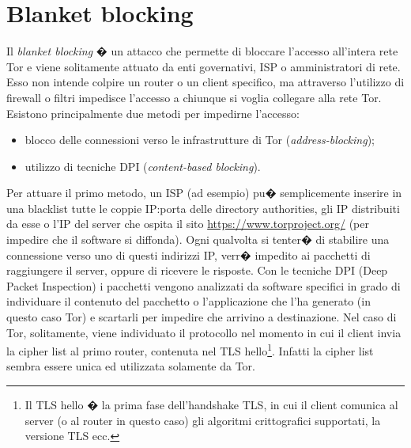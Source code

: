 \chapter{Blanket blocking}
Il \emph{blanket blocking} � un attacco che permette di bloccare l'accesso all'intera rete Tor e viene solitamente attuato da enti governativi, ISP o amministratori di rete. Esso non intende colpire un router o un client specifico, ma attraverso l'utilizzo di firewall o filtri impedisce l'accesso a chiunque si voglia collegare alla rete Tor.
Esistono principalmente due metodi per impedirne l'accesso:
\begin{itemize}
\item blocco delle connessioni verso le infrastrutture di Tor (\emph{address-blocking});
\item utilizzo di tecniche DPI (\emph{content-based blocking}).
\end{itemize}
Per attuare il primo metodo, un ISP (ad esempio) pu� semplicemente inserire in una blacklist tutte le coppie IP:porta delle directory authorities, gli IP distribuiti da esse o l'IP del server che ospita il sito \url{https://www.torproject.org/} (per impedire che il software si diffonda). Ogni qualvolta si tenter� di stabilire una connessione verso uno di questi indirizzi IP, verr� impedito ai pacchetti di raggiungere il server, oppure di ricevere le risposte. Con le tecniche DPI (Deep Packet Inspection) i pacchetti vengono analizzati da software specifici in grado di individuare il contenuto del pacchetto o l'applicazione che l'ha generato (in questo caso Tor) e scartarli per impedire che arrivino a destinazione. Nel caso di Tor, solitamente, viene individuato il protocollo nel momento in cui il client invia la cipher list al primo router, contenuta nel TLS hello\footnote{Il TLS hello � la prima fase dell'handshake TLS, in cui il client comunica al server (o al router in questo caso) gli algoritmi crittografici supportati, la versione TLS ecc.}. Infatti la cipher list sembra essere unica ed utilizzata solamente da Tor.

